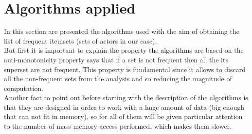 \documentclass[14pt]{extarticle}
\begin{document}
\section{Algorithms applied}
In this section are presented the algorithms used with the aim of obtaining the list of frequent itemsets (sets of actors in our case).\\
But first it is important to explain the property the algorithms are based on the anti-monotonicity property says that if a set is not frequent then all the its superset are not frequent. This property is fundamental since it allows to discard all the non-frequent sets from the analysis and so reducing the magnitude of computation.\\
Another fact to point out before starting with the description of the algorithms is that they are designed in order to work with a huge amount of data (big enough that can not fit in memory), so for all of them will be given particular attention to the number of mass memory access performed, which makes them slower.
\end{document}
